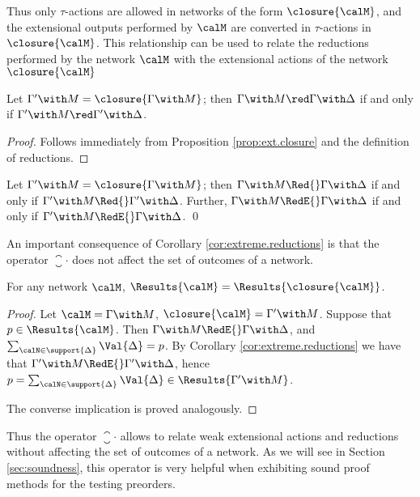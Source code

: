 \documentclass{LMCS}
\begin{document}
\noindent Thus only $\tau$-actions are allowed in networks of the form 
$\closure{\calM}$, and the extensional outputs performed 
by $\calM$ are converted in $\tau$-actions in $\closure{\calM}$. 
This relationship can be used to relate the reductions performed 
by the network $\calM$ with the extensional actions of the 
network $\closure{\calM}$

\begin{prop}
Let $\Gamma' \with M = \closure{\Gamma \with M}$; then 
$\Gamma \with M \red \Gamma \with \Delta$ if and 
only if $\Gamma' \with M \red \Gamma' \with \Delta$.
\end{prop} 

\begin{proof}
Follows immediately from Proposition \ref{prop:ext.closure} 
and the definition of reductions.
\end{proof}

\begin{cor}
\label{cor:extreme.reductions}
Let $\Gamma' \with M = \closure{\Gamma \with M}$; then 
$\Gamma \with M \Red{} \Gamma \with \Delta$ if 
and only if $\Gamma' \with M \Red{} \Gamma' \with \Delta$. 
Further, $\Gamma \with M \RedE{} \Gamma \with \Delta$ 
if and only if $\Gamma' \with M \RedE{} \Gamma \with \Delta$. 
\qed
\end{cor}

An important consequence of Corollary \ref{cor:extreme.reductions} 
is that the operator $\closure{\cdot}$ does not affect the 
set of outcomes of a network. 
\begin{cor}
\label{cor:closure.results}
For any network $\calM$, $\Results{\calM} = \Results{\closure{\calM}}$.
\end{cor}

\begin{proof}
Let $\calM = \Gamma \with M$, $\closure{\calM} = \Gamma' \with M$. 
Suppose that $p \in \Results{\calM}$. Then 
$\Gamma \with M \RedE{} \Gamma \with \Delta$, and 
$\sum_{\calN \in \support{\Delta}} \Val{\Delta} = p$. 
By Corollary \ref{cor:extreme.reductions} we have 
that $\Gamma' \with M \RedE{} \Gamma' \with \Delta$, 
hence $p = \sum_{\calN \in \support{\Delta}} \Val{\Delta} \in 
\Results{\Gamma' \with M}$. 

The converse implication is proved analogously.
\end{proof}

\noindent Thus the operator $\closure{\cdot}$ allows to relate weak 
extensional actions and reductions without affecting the 
set of outcomes of a network. As we will see in 
Section \ref{sec:soundness}, this operator is very 
helpful when exhibiting sound proof methods for the 
testing preorders.
\end{document}
